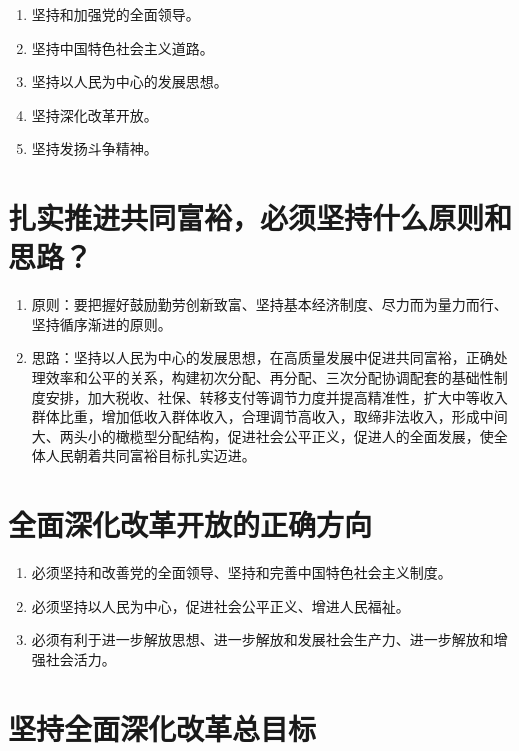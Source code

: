 \documentclass[12pt, a4paper, oneside]{ctexbook}
\begin{document}
\begin{enumerate}
\item 坚持和加强党的全面领导。

\item 坚持中国特色社会主义道路。

\item 坚持以人民为中心的发展思想。

\item 坚持深化改革开放。

\item 坚持发扬斗争精神。
\end{enumerate}

\section{扎实推进共同富裕，必须坚持什么原则和思路？}

\begin{enumerate}
\item 原则：要把握好鼓励勤劳创新致富、坚持基本经济制度、尽力而为量力而行、坚持循序渐进的原则。

\item 思路：坚持以人民为中心的发展思想，在高质量发展中促进共同富裕，正确处理效率和公平的关系，构建初次分配、再分配、三次分配协调配套的基础性制度安排，加大税收、社保、转移支付等调节力度并提高精准性，扩大中等收入群体比重，增加低收入群体收入，合理调节高收入，取缔非法收入，形成中间大、两头小的橄榄型分配结构，促进社会公平正义，促进人的全面发展，使全体人民朝着共同富裕目标扎实迈进。
\end{enumerate}

\section{全面深化改革开放的正确方向}

\begin{enumerate}
\item 必须坚持和改善党的全面领导、坚持和完善中国特色社会主义制度。

\item 必须坚持以人民为中心，促进社会公平正义、增进人民福祉。

\item 必须有利于进一步解放思想、进一步解放和发展社会生产力、进一步解放和增强社会活力。
\end{enumerate}

\section{坚持全面深化改革总目标}
\end{document}
